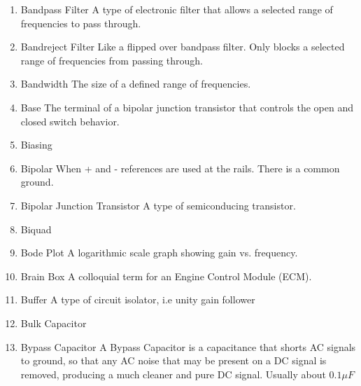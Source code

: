 \documentclass{IEEEtran}
\begin{document}
\begin{enumerate}
\\
\item Bandpass Filter
  \subitem A type of electronic filter that allows a selected range of frequencies to pass through. \\
\item Bandreject Filter
  \subitem Like a flipped over bandpass filter. Only blocks a selected range of frequencies from passing through. \\
\item Bandwidth
  \subitem The size of a defined range of frequencies.
\item Base
  \subitem The terminal of a bipolar junction transistor that controls the open and closed switch behavior.\\
\item Biasing
\item Bipolar
  \subitem When + and - references are used at the rails. There is a common ground. 
\item Bipolar Junction Transistor
  \subitem A type of semiconducing transistor.\\
\item Biquad
  \subitem \\ 
\item Bode Plot
  \subitem A logarithmic scale graph showing gain vs. frequency. 
\item Brain Box
  \subitem A colloquial term for an Engine Control Module (ECM).\\ 
\item Buffer
  \subitem A type of circuit isolator, i.e unity gain follower\\
\item Bulk Capacitor
  \subitem \\ 
\item Bypass Capacitor
  \subitem A Bypass Capacitor is a capacitance that shorts AC signals to ground, so that any AC noise that may be present on a DC signal is removed, producing a much cleaner and pure DC signal. Usually about $0.1 \mu F$ \\
\ 


\end{enumerate}
\end{document}
